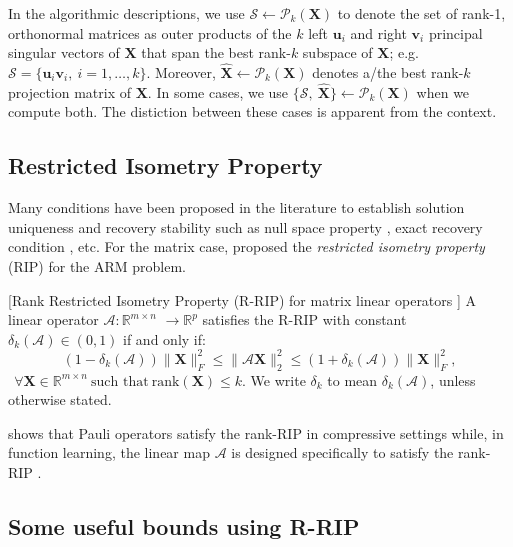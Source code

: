 \documentclass[twocolumn]{svjour3}
\newcommand{\vectornormbig}[1]{\big\|#1\big\|}
\newcommand{\sensing}{\boldsymbol{\mathcal{A}}}
\newcommand{\signal}{\boldsymbol{X}}
\newcommand{\dimension}{m \times n}
\newcommand{\numsam}{p}
\newcommand{\rank}{k}
\begin{document}
In the algorithmic descriptions, we use $\mathcal{S} \leftarrow \mathcal{P}_{\rank}\left(\signal\right)$ to denote the set of rank-1, orthonormal matrices as outer products of the $\rank$ left $\boldsymbol{u}_i$ and right $\boldsymbol{v}_i$ principal singular vectors of $\signal$ that span the best rank-$\rank$ subspace of $\signal$; e.g. $\mathcal{S} = \lbrace \boldsymbol{u}_i \boldsymbol{v}_i,~i = 1,\dots,\rank\rbrace$. Moreover, $\widehat{\signal} \leftarrow \mathcal{P}_{\rank}\left(\signal\right)$ denotes a/the best rank-$\rank$ projection matrix of $\signal$. In some cases, we use $\lbrace \mathcal{S},~\widehat{\signal} \rbrace \leftarrow \mathcal{P}_{\rank}\left(\signal\right)$ when we compute both. The distiction between these cases is apparent from the context.

\subsection{Restricted Isometry Property}

Many conditions have been proposed in the literature to establish solution uniqueness and recovery stability such as null space property \cite{cohen06}, exact recovery condition \cite{Tro04:Greed-Good}, etc.
For the matrix case, \cite{brecht2010} proposed the {\it restricted isometry property} (RIP) for the ARM problem. 

\begin{definition}{\label{def:RIP}}[Rank Restricted Isometry Property (R-RIP) for matrix linear operators \cite{brecht2010}] A linear operator $ \sensing: \mathbb{R}^{\dimension} $ $\rightarrow \mathbb{R}^{\numsam} $ satisfies the R-RIP with constant $ \delta_{\rank}(\sensing) \in (0,1)$ if and only if:
\begin{equation}\label{eq:RIP}
  (1-\delta_{\rank}(\sensing))\vectornormbig{\signal}_F^2 \leq \vectornormbig{\sensing \signal}_2^2 \leq (1+\delta_{\rank}(\sensing))\vectornormbig{\signal}_F^2, 
\end{equation} $ ~~\forall \boldsymbol{X} \in \mathbb{R}^{\dimension} ~\text{such that} ~\text{rank}(\signal) \leq \rank. $ We write $\delta_{\rank}$ to mean $\delta_{\rank}(\sensing)$, unless otherwise stated.
\end{definition} \cite{liuuniversal} shows that Pauli operators satisfy the rank-RIP in compressive settings while, in function learning, the linear map $\sensing$ is designed specifically to satisfy the rank-RIP \cite{hemant2012active}.

\subsection{Some useful bounds using R-RIP}
\end{document}
